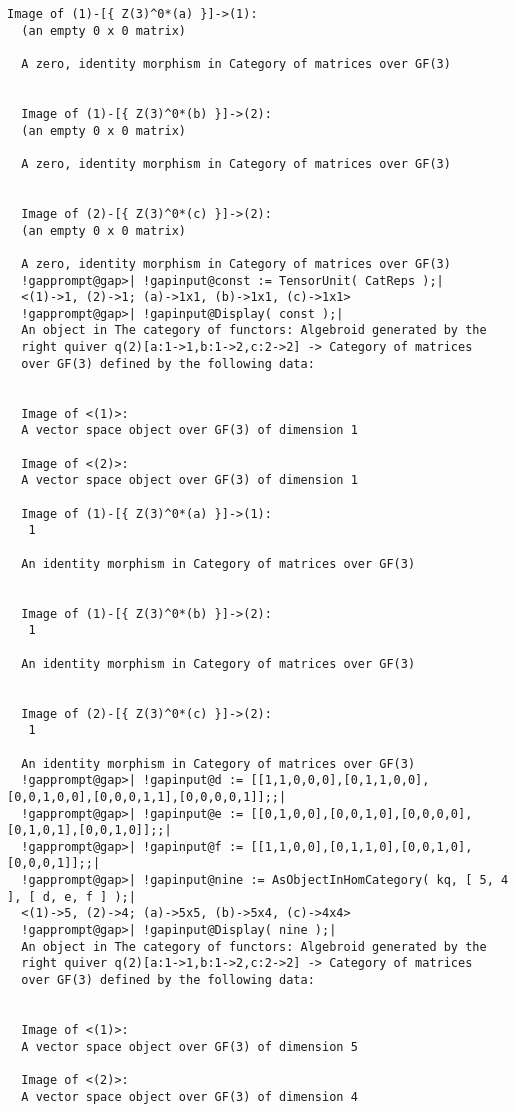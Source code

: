 \documentclass[a4paper,11pt]{report}
\begin{document}
{{{\begin{Verbatim}[commandchars=!@|,fontsize=\small,frame=single,label=Example]
  Image of (1)-[{ Z(3)^0*(a) }]->(1):
  (an empty 0 x 0 matrix)
  
  A zero, identity morphism in Category of matrices over GF(3)
  
  
  Image of (1)-[{ Z(3)^0*(b) }]->(2):
  (an empty 0 x 0 matrix)
  
  A zero, identity morphism in Category of matrices over GF(3)
  
  
  Image of (2)-[{ Z(3)^0*(c) }]->(2):
  (an empty 0 x 0 matrix)
  
  A zero, identity morphism in Category of matrices over GF(3)
  !gapprompt@gap>| !gapinput@const := TensorUnit( CatReps );|
  <(1)->1, (2)->1; (a)->1x1, (b)->1x1, (c)->1x1>
  !gapprompt@gap>| !gapinput@Display( const );|
  An object in The category of functors: Algebroid generated by the
  right quiver q(2)[a:1->1,b:1->2,c:2->2] -> Category of matrices
  over GF(3) defined by the following data:
  
  
  Image of <(1)>:
  A vector space object over GF(3) of dimension 1
  
  Image of <(2)>:
  A vector space object over GF(3) of dimension 1
  
  Image of (1)-[{ Z(3)^0*(a) }]->(1):
   1
  
  An identity morphism in Category of matrices over GF(3)
  
  
  Image of (1)-[{ Z(3)^0*(b) }]->(2):
   1
  
  An identity morphism in Category of matrices over GF(3)
  
  
  Image of (2)-[{ Z(3)^0*(c) }]->(2):
   1
  
  An identity morphism in Category of matrices over GF(3)
  !gapprompt@gap>| !gapinput@d := [[1,1,0,0,0],[0,1,1,0,0],[0,0,1,0,0],[0,0,0,1,1],[0,0,0,0,1]];;|
  !gapprompt@gap>| !gapinput@e := [[0,1,0,0],[0,0,1,0],[0,0,0,0],[0,1,0,1],[0,0,1,0]];;|
  !gapprompt@gap>| !gapinput@f := [[1,1,0,0],[0,1,1,0],[0,0,1,0],[0,0,0,1]];;|
  !gapprompt@gap>| !gapinput@nine := AsObjectInHomCategory( kq, [ 5, 4 ], [ d, e, f ] );|
  <(1)->5, (2)->4; (a)->5x5, (b)->5x4, (c)->4x4>
  !gapprompt@gap>| !gapinput@Display( nine );|
  An object in The category of functors: Algebroid generated by the
  right quiver q(2)[a:1->1,b:1->2,c:2->2] -> Category of matrices
  over GF(3) defined by the following data:
  
  
  Image of <(1)>:
  A vector space object over GF(3) of dimension 5
  
  Image of <(2)>:
  A vector space object over GF(3) of dimension 4
  

\end{Verbatim}}}}
\end{document}
